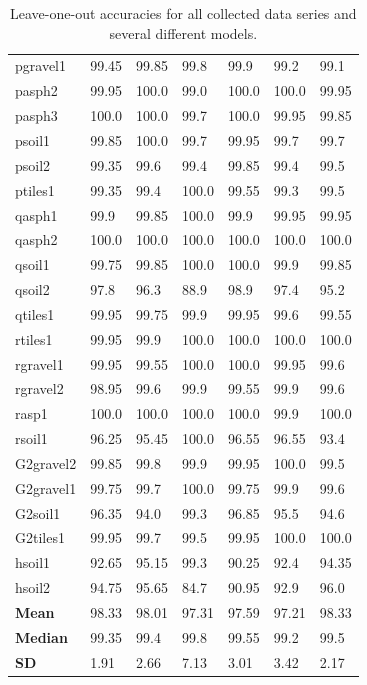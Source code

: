 \begin{table}
\begin{center}
\begin{adjustbox}{totalheight=\baselineskip}
\begin{tabular}{|l|l|l|l|l|l|l|}
		pgravel1 & 99.45 & 99.85 & 99.8 & 99.9 & 99.2 & 99.1\\
		pasph2 & 99.95 & 100.0 & 99.0 & 100.0 & 100.0 & 99.95\\
		pasph3 & 100.0 & 100.0 & 99.7 & 100.0 & 99.95 & 99.85\\
		psoil1 & 99.85 & 100.0 & 99.7 & 99.95 & 99.7 & 99.7\\
		psoil2 & 99.35 & 99.6 & 99.4 & 99.85 & 99.4 & 99.5\\
		ptiles1 & 99.35 & 99.4 & 100.0 & 99.55 & 99.3 & 99.5\\
		qasph1 & 99.9 & 99.85 & 100.0 & 99.9 & 99.95 & 99.95\\
		qasph2 & 100.0 & 100.0 & 100.0 & 100.0 & 100.0 & 100.0\\
		qsoil1 & 99.75 & 99.85 & 100.0 & 100.0 & 99.9 & 99.85\\
		qsoil2 & 97.8 & 96.3 & \cellcolor{red!20}88.9 & 98.9 & 97.4 & 95.2\\
		qtiles1 & 99.95 & 99.75 & 99.9 & 99.95 & 99.6 & 99.55\\
		rtiles1 & 99.95 & 99.9 & 100.0 & 100.0 & 100.0 & 100.0\\
		rgravel1 & 99.95 & 99.55 & 100.0 & 100.0 & 99.95 & 99.6\\
		rgravel2 & 98.95 & 99.6 & 99.9 & 99.55 & 99.9 & 99.6\\
		rasp1 & 100.0 & 100.0 & 100.0 & 100.0 & 99.9 & 100.0\\
		rsoil1 & 96.25 & 95.45 & 100.0 & 96.55 & 96.55 & 93.4\\
		G2gravel2 & 99.85 & 99.8 & 99.9 & 99.95 & 100.0 & 99.5\\
		G2gravel1 & 99.75 & 99.7 & 100.0 & 99.75 & 99.9 & 99.6\\
		G2soil1 & 96.35 & 94.0 & 99.3 & 96.85 & 95.5 & 94.6\\
		G2tiles1 & 99.95 & 99.7 & 99.5 & 99.95 & 100.0 & 100.0\\
		hsoil1 & 92.65 & 95.15 & 99.3 & 90.25 & 92.4 & 94.35\\
		hsoil2 & 94.75 & 95.65 & \cellcolor{red!20}84.7 & 90.95 & 92.9 & 96.0\\
		\hline
		\textbf{Mean} & 98.33 & 98.01 & 97.31 & 97.59 & 97.21 & 98.33\\
		\textbf{Median} & 99.35 & 99.4 & 99.8 & 99.55 & 99.2 & 99.5\\
		\textbf{SD} & 1.91 & 2.66 & 7.13 & 3.01 & 3.42 & 2.17\\
		\hline
		\end{tabular}
	\end{adjustbox}
	\end{center}
	\label{tab:loo}
	\caption{Leave-one-out accuracies for all collected data series and several different models.}
\end{table}

